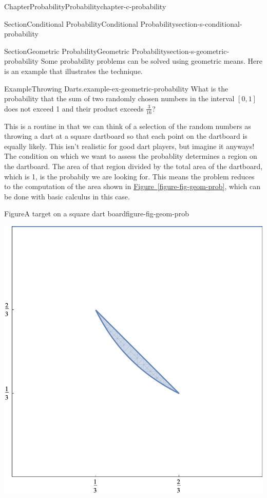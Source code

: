 \documentclass[oneside,10pt,]{book}
\newcommand{\xreffont}{\relax}
\numberwithin{equation}{section}
\begin{document}
\begin{chapterptx}{Chapter}{Probability}{}{Probability}{}{}{chapter-c-probability}
\begin{sectionptx}{Section}{Conditional Probability}{}{Conditional Probability}{}{}{section-s-conditional-probability}
\end{sectionptx}
%
%
\typeout{************************************************}
\typeout{************************************************}
%
\begin{sectionptx}{Section}{Geometric Probability}{}{Geometric Probability}{}{}{section-s-geometric-probability}
Some probability problems can be solved using geometric means. Here is an example that illustrates the technique.%
\begin{example}{Example}{Throwing Darts.}{example-ex-geometric-probability}%
What is the probability that the sum of two randomly chosen numbers in the interval \([0, 1]\) does not exceed 1 and their product exceeds \(\frac{3}{16}\)?%
\par
This is a routine in that we can think of a selection of the random numbers as throwing a dart at a square dartboard so that each point on the dartboard is equally likely.  This isn't realistic for good dart players, but imagine it anyways!  The condition on which  we want to assess the probablity determines a region on the dartboard.  The area of that region divided by the total area of the dartboard, which is 1, is the probabily we are looking for.   This means the problem reduces to the computation of the area shown in \hyperref[figure-fig-geom-prob]{Figure~{\xreffont\ref{figure-fig-geom-prob}}}, which can be done with basic calculus in this case.%
\begin{figureptx}{Figure}{A target on a square dart board}{figure-fig-geom-prob}{}%
\begin{image}{0.2}{0.6}{0.2}{}%
\includegraphics[width=\linewidth]{images/fig-geom-prob.png}

\end{image}
\end{figureptx}
\end{example}
\end{sectionptx}
\end{chapterptx}
\end{document}
